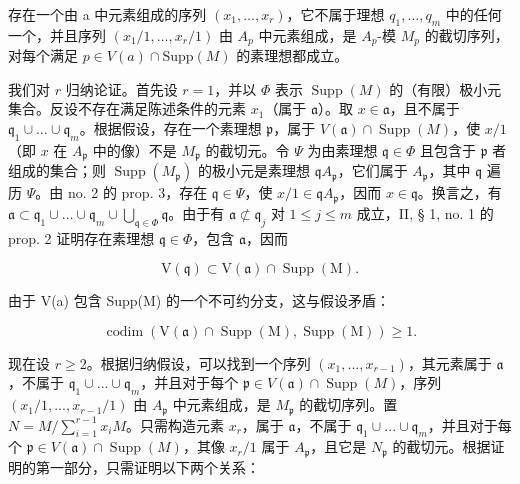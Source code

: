 存在一个由 a 中元素组成的序列 \((x_{1}, \ldots, x_{r})\)，它不属于理想 \(q_{1}, \ldots, q_{m}\) 中的任何一个，并且序列 \((x_{1}/1, \ldots, x_{r}/1)\) 由 \(A_{p}\) 中元素组成，是 \(A_{p}\)-模 \(M_{p}\) 的截切序列，对每个满足 \(p \in V(a) \cap \text{Supp}(M)\) 的素理想都成立。

我们对 \(r\) 归纳论证。首先设 \(r = 1\)，并以 \(\Phi\) 表示 \(\operatorname{Supp}(M)\) 的（有限）极小元集合。反设不存在满足陈述条件的元素 \(x_1\)（属于 \(\mathfrak{a}\)）。取 \(x \in \mathfrak{a}\)，且不属于 \(\mathfrak{q}_1 \cup \ldots \cup \mathfrak{q}_m\)。根据假设，存在一个素理想 \(\mathfrak{p}\)，属于 \(V(\mathfrak{a}) \cap \operatorname{Supp}(M)\)，使 \(x/1\)（即 \(x\) 在 \(A_{\mathfrak{p}}\) 中的像）不是 \(M_{\mathfrak{p}}\) 的截切元。令 \(\Psi\) 为由素理想 \(\mathfrak{q} \in \Phi\) 且包含于 \(\mathfrak{p}\) 者组成的集合；则 \(\operatorname{Supp}(M_{\mathfrak{p}})\) 的极小元是素理想 \(\mathfrak{q}A_{\mathfrak{p}}\)，它们属于 \(A_{\mathfrak{p}}\)，其中 \(\mathfrak{q}\) 遍历 \(\Psi\)。由 no. 2 的 prop. 3，存在 \(\mathfrak{q} \in \Psi\)，使 \(x/1 \in \mathfrak{q}A_{\mathfrak{p}}\)，因而 \(x \in \mathfrak{q}\)。换言之，有 \(\mathfrak{a} \subset \mathfrak{q}_1 \cup \ldots \cup \mathfrak{q}_m \cup \bigcup_{\mathfrak{q} \in \Phi} \mathfrak{q}\)。由于有 \(\mathfrak{a} \not\subset \mathfrak{q}_j\) 对 \(1 \leqslant j \leqslant m\) 成立，II, § 1, no. 1 的 prop. 2 证明存在素理想 \(\mathfrak{q} \in \Phi\)，包含 \(\mathfrak{a}\)，因而

\[
\mathrm{V} (\mathfrak {q}) \subset \mathrm{V} (\mathfrak {a}) \cap \operatorname{Supp} (\mathrm{M}).
\]

由于 V(a) 包含 Supp(M) 的一个不可约分支，这与假设矛盾：

\[
\operatorname{codim} (\mathrm{V} (\mathfrak {a}) \cap \operatorname{Supp} (\mathrm{M}), \operatorname{Supp} (\mathrm{M})) \geqslant 1.
\]

现在设 \(r \geqslant 2\)。根据归纳假设，可以找到一个序列 \((x_1, ..., x_{r-1})\)，其元素属于 \(\mathfrak{a}\)，不属于 \(\mathfrak{q}_1 \cup ... \cup \mathfrak{q}_m\)，并且对于每个 \(\mathfrak{p} \in V(\mathfrak{a}) \cap \operatorname{Supp}(M)\)，序列 \((x_1/1, ..., x_{r-1}/1)\) 由 \(A_{\mathfrak{p}}\) 中元素组成，是 \(M_{\mathfrak{p}}\) 的截切序列。置 \(N = M / \sum_{i=1}^{r-1} x_i M\)。只需构造元素 \(x_r\)，属于 \(\mathfrak{a}\)，不属于 \(\mathfrak{q}_1 \cup ... \cup \mathfrak{q}_m\)，并且对于每个 \(\mathfrak{p} \in V(\mathfrak{a}) \cap \operatorname{Supp}(M)\)，其像 \(x_r/1\) 属于 \(A_{\mathfrak{p}}\)，且它是 \(N_{\mathfrak{p}}\) 的截切元。根据证明的第一部分，只需证明以下两个关系：


